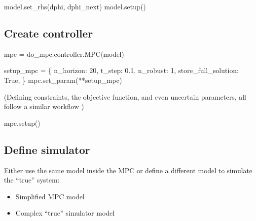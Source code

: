 \documentclass[
  letterpaper,
  DIV=11,
  numbers=noendperiod,
  oneside]{scrartcl}
\newenvironment{Shaded}{\begin{snugshade}}{\end{snugshade}}
\newcommand{\DecValTok}[1]{\textcolor[rgb]{0.68,0.00,0.00}{#1}}
\newcommand{\FloatTok}[1]{\textcolor[rgb]{0.68,0.00,0.00}{#1}}
\newcommand{\NormalTok}[1]{\textcolor[rgb]{0.00,0.23,0.31}{#1}}
\newcommand{\OperatorTok}[1]{\textcolor[rgb]{0.37,0.37,0.37}{#1}}
\newcommand{\StringTok}[1]{\textcolor[rgb]{0.13,0.47,0.30}{#1}}
\newcommand{\VariableTok}[1]{\textcolor[rgb]{0.07,0.07,0.07}{#1}}
\providecommand{\tightlist}{%
  \setlength{\itemsep}{0pt}\setlength{\parskip}{0pt}}\usepackage{longtable,booktabs,array}
\begin{document}
\begin{Shaded}
\begin{Highlighting}[numbers=left,,]
\NormalTok{model.set\_rhs(}\StringTok{\textquotesingle{}dphi\textquotesingle{}}\NormalTok{, dphi\_next)}
\NormalTok{model.setup()}
\end{Highlighting}
\end{Shaded}

\subsection{Create controller}\label{create-controller}

\begin{Shaded}
\begin{Highlighting}[numbers=left,,]
\NormalTok{mpc }\OperatorTok{=}\NormalTok{ do\_mpc.controller.MPC(model)}

\NormalTok{setup\_mpc }\OperatorTok{=}\NormalTok{ \{}
    \StringTok{\textquotesingle{}n\_horizon\textquotesingle{}}\NormalTok{: }\DecValTok{20}\NormalTok{,}
    \StringTok{\textquotesingle{}t\_step\textquotesingle{}}\NormalTok{: }\FloatTok{0.1}\NormalTok{,}
    \StringTok{\textquotesingle{}n\_robust\textquotesingle{}}\NormalTok{: }\DecValTok{1}\NormalTok{,}
    \StringTok{\textquotesingle{}store\_full\_solution\textquotesingle{}}\NormalTok{: }\VariableTok{True}\NormalTok{,}
\NormalTok{\}}
\NormalTok{mpc.set\_param(}\OperatorTok{**}\NormalTok{setup\_mpc)}
\end{Highlighting}
\end{Shaded}

(Defining constraints, the objective function, and even uncertain
parameters, all follow a similar workflow )

\begin{Shaded}
\begin{Highlighting}[]
\NormalTok{mpc.setup()}
\end{Highlighting}
\end{Shaded}

\subsection{Define simulator}\label{define-simulator}

Either use the same model inside the MPC or define a different model to
simulate the ``true'' system:

\begin{itemize}
\tightlist
\item
  Simplified MPC model
\item
  Complex ``true'' simulator model
\end{itemize}
\end{document}
